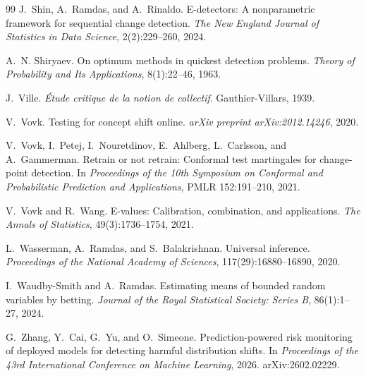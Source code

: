 \begin{thebibliography}{99}
J.~Shin, A.~Ramdas, and A.~Rinaldo.
E-detectors: A nonparametric framework for sequential change detection.
\textit{The New England Journal of Statistics in Data Science}, 2(2):229--260, 2024.

A.~N. Shiryaev.
On optimum methods in quickest detection problems.
\textit{Theory of Probability and Its Applications}, 8(1):22--46, 1963.

J.~Ville.
\textit{\'Etude critique de la notion de collectif}.
Gauthier-Villars, 1939.

V.~Vovk.
Testing for concept shift online.
\textit{arXiv preprint arXiv:2012.14246}, 2020.

V.~Vovk, I.~Petej, I.~Nouretdinov, E.~Ahlberg, L.~Carlsson, and A.~Gammerman.
Retrain or not retrain: Conformal test martingales for change-point detection.
In \textit{Proceedings of the 10th Symposium on Conformal and Probabilistic Prediction and Applications}, PMLR 152:191--210, 2021.

V.~Vovk and R.~Wang.
E-values: Calibration, combination, and applications.
\textit{The Annals of Statistics}, 49(3):1736--1754, 2021.

L.~Wasserman, A.~Ramdas, and S.~Balakrishnan.
Universal inference.
\textit{Proceedings of the National Academy of Sciences}, 117(29):16880--16890, 2020.

I.~Waudby-Smith and A.~Ramdas.
Estimating means of bounded random variables by betting.
\textit{Journal of the Royal Statistical Society: Series B}, 86(1):1--27, 2024.

G.~Zhang, Y.~Cai, G.~Yu, and O.~Simeone.
Prediction-powered risk monitoring of deployed models for detecting harmful distribution shifts.
In \textit{Proceedings of the 43rd International Conference on Machine Learning}, 2026. arXiv:2602.02229.

\end{thebibliography}
